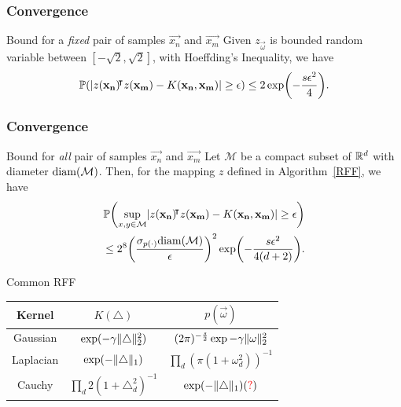 \documentclass[10pt]{../formats/RU}
\begin{document}
\begin{frame}
  \frametitle{Convergence}
  \begin{exampleblock}{Bound for a \emph{fixed} pair of samples $\vec{x_n}$ and $\vec{x_m}$}
    Given $z_{\vec{\omega}}$ is bounded random variable between $[-\sqrt{2}, \sqrt{2}]$, with Hoeffding's Inequality, we have
    \begin{align*}
      \P{\abs{z(\vec{x_n})\trn z(\vec{x_m})-K(\vec{x_n}, \vec{x_m})}\geq \epsilon} \leq 2\exp\parens*{-\frac{s\epsilon^2}{4}}.
    \end{align*}
  \end{exampleblock}
\end{frame}
\begin{frame}
  \frametitle{Convergence}
  \begin{exampleblock}{Bound for \emph{all} pair of samples $\vec{x_n}$ and $\vec{x_m}$}
    Let $\mathcal{M}$ be a compact subset of $\mathbb{R}^d$ with diameter $\textnormal{diam}(\mathcal{M})$. Then, for the mapping $z$ defined in Algorithm~\ref{RFF}, we have
    \begin{align*}
      \P{\sup_{x,y\in\mathcal{M}}\abs{z(\vec{x_n})\trn z(\vec{x_m})-K(\vec{x_n}, \vec{x_m})}\geq \epsilon} \\
      \leq 2^8\parens*{\frac{\sigma_{p(\cdot)}\textnormal{diam}(\mathcal{M})}{\epsilon}}^2\exp\parens*{-\frac{s\epsilon^2}{4(d+2)}}.
    \end{align*}
  \end{exampleblock}
\end{frame}
\begin{frame}{Common RFF}
  \centering
  \begin{tabular}{c c c}
    Kernel & $K(\triangle)$ & $p(\vec{\omega})$ \\
    \hline
    Gaussian & $\exp(-\gamma\lVert\triangle\rVert_2^2)$ & $(2\pi)^{-\frac{s}{2}}\exp{-\gamma\lVert\mathbf{\omega}\rVert_2^2}$\\
    Laplacian & $\exp(-\lVert\triangle\rVert_1)$ & $\prod\limits_{d}(\pi(1+\omega_d^2))^{-1}$\\
    Cauchy & $\prod\limits_{d}2(1+\triangle_d^2)^{-1}$ & $\exp(-\lVert\triangle\rVert_1)(\textcolor{red}{\mathord{?}})$
  \end{tabular}
\end{frame}
\end{document}
